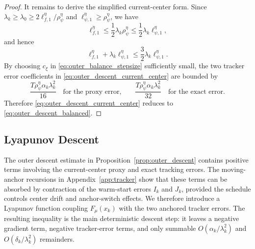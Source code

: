 \documentclass{article}
\begin{document}
\begin{proof}
It remains to derive the simplified current-center form. Since
\(\lambda_k\ge \lambda_0\ge 2\ell_{f,1}^\eta/\rho_\psi^\eta\) and
\(\ell_{\psi,1}^\eta\ge \rho_\psi^\eta\), we have
\[
\ell_{f,1}^\eta
\le
\frac12\lambda_k\rho_\psi^\eta
\le
\frac12\lambda_k\ell_{\psi,1}^\eta,
\]
and hence
\[
\ell_{f,1}^\eta+\lambda_k\ell_{\psi,1}^\eta
\le
\frac32\lambda_k\ell_{\psi,1}^\eta .
\]
By choosing \(c_\xi\) in \eqref{eq:outer_balance_stepsize} sufficiently small, the two tracker
error coefficients in \eqref{eq:outer_descent_current_center} are bounded by
\[
\frac{T\rho_\psi^\eta\alpha_k\lambda_k^2}{16}
\quad\text{for the proxy error,}
\qquad
\frac{T\rho_\psi^\eta\alpha_k\lambda_k^2}{32}
\quad\text{for the exact error.}
\]
Therefore \eqref{eq:outer_descent_current_center} reduces to
\eqref{eq:outer_descent_balanced}.
\end{proof}



\subsection{Lyapunov Descent}
\label{app:lyapunov}

The outer descent estimate in Proposition~\ref{prop:outer_descent} contains positive terms involving
the current-center proxy and exact tracking errors. The moving-anchor recursions in
Appendix~\ref{app:tracker} show that these terms can be absorbed by contraction of the warm-start
errors \(I_k\) and \(J_k\), provided the schedule controls center drift and anchor-switch effects. We
therefore introduce a Lyapunov function coupling \(F_\mu(x_k)\) with the two anchored tracker
errors. The resulting inequality is the main deterministic descent step: it leaves a negative gradient
term, negative tracker-error terms, and only summable \(O(\alpha_k/\lambda_k^2)\) and
\(O(\delta_k/\lambda_k^2)\) remainders.
\end{document}
